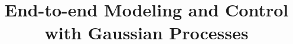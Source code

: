 \documentclass{sig-alternate-ipsn13}
\begin{document}
\title{End-to-end Modeling and Control with Gaussian Processes}
%
%
%
%
%
\end{document}
